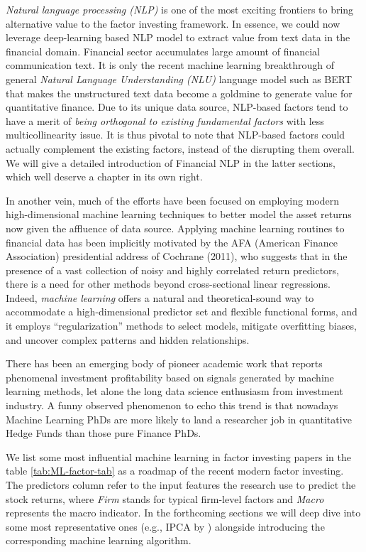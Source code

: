 \documentclass[
]{book}
\begin{document}
{\emph{Natural language processing (NLP)}} is one of the most exciting frontiers to bring alternative value to the factor investing framework. In essence, we could now leverage deep-learning based NLP model to extract value from text data in the financial domain. Financial sector accumulates large amount of financial communication text. It is only the recent machine learning breakthrough of general {\emph{Natural Language Understanding (NLU)}} language model such as BERT \citep{devlin2018bert} that makes the unstructured text data become a goldmine to generate value for quantitative finance. Due to its unique data source, NLP-based factors tend to have a merit of {\emph{being orthogonal to existing fundamental factors}} with less multicollinearity issue. It is thus pivotal to note that NLP-based factors could actually complement the existing factors, instead of the disrupting them overall. We will give a detailed introduction of Financial NLP in the latter sections, which well deserve a chapter in its own right.

In another vein, much of the efforts have been focused on employing modern high-dimensional machine learning techniques to better model the asset returns now given the affluence of data source. Applying machine learning routines to financial data has been implicitly motivated by the AFA (American Finance Association) presidential address of Cochrane (2011), who suggests that in the presence of a vast collection of noisy and highly correlated return predictors, there is a need for other methods beyond cross-sectional linear regressions. Indeed, {\emph{machine learning}} offers a natural and theoretical-sound way to accommodate a high-dimensional predictor set and flexible functional forms, and it employs ``regularization'' methods to select models, mitigate overfitting biases, and uncover complex patterns and hidden relationships.

There has been an emerging body of pioneer academic work that reports phenomenal investment profitability based on signals generated by machine learning methods, let alone the long data science enthusiasm from investment industry. A funny observed phenomenon to echo this trend is that nowadays Machine Learning PhDs are more likely to land a researcher job in quantitative Hedge Funds than those pure Finance PhDs.

We list some most influential machine learning in factor investing papers in the table \ref{tab:ML-factor-tab} as a roadmap of the recent modern factor investing. The predictors column refer to the input features the research use to predict the stock returns, where \emph{Firm} stands for typical firm-level factors and \emph{Macro} represents the macro indicator. In the forthcoming sections we will deep dive into some most representative ones (e.g., IPCA by \citet{kelly2019characteristics}) alongside introducing the corresponding machine learning algorithm.
\end{document}
